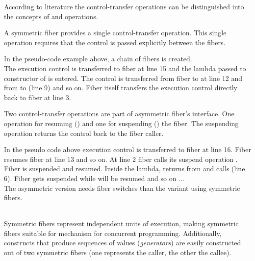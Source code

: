 
According to literature\cite{Moura2009} the control-transfer operations can be
distinguished into the concepts of \sym and \asym operations.

 A symmetric fiber provides a single
control-transfer operation. This single operation requires that the control is
passed explicitly between the fibers.\\


In the pseudo-code example above, a chain of fibers is created.\\
The execution control is transferred to fiber  at line 15 and the lambda
passed to constructor of  is entered. The control is transferred from
fiber  to  at line 12 and from  to  (line 9) and
so on. Fiber  itself transfers the execution control directly back to
fiber  at line 3.

 Two control-transfer operations are part of
asymmetric fiber's interface. One operation for resuming (\resume) and one for
suspending () the fiber. The suspending operation returns the
control back to the fiber caller.\\

In the pseudo code above execution control is transferred to fiber  at
line 16. Fiber  resumes fiber  at line 13 and so on. At line 2
fiber  calls its suspend operation . Fiber 
is suspended and  resumed. Inside the lambda,  returns from
 and calls  (line 6). Fiber  gets
suspended while  will be resumed and so on ...\\
The asymmetric version needs  fiber switches than the variant
using symmetric fibers.\\

\\
\newline

Symmetric fibers represent independent units of execution, making symmetric
fibers suitable for mechanism for concurrent programming. Additionally,
constructs that produce sequences of values (\emph{generators}) are easily
constructed out of two symmetric fibers (one represents the caller, the other
the callee).\\

